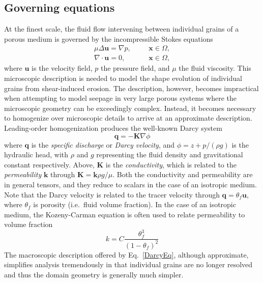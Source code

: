 \documentclass[11pt]{article}
\newcommand{\bvec}[1]{{\mathbf{#1}}}
\newcommand{\grad}{\nabla}
\newcommand{\uu}{\bvec{u}}
\newcommand{\xx}{\bvec{x}}
\newcommand {\qq} {\bvec{q}}
\begin{document}
\subsection{Governing equations}
At the finest scale, the fluid flow intervening between individual grains of a porous medium is governed by the incompressible Stokes equations
\begin{equation}
\label{StokesEq}
\begin{split}
\mu \Delta \uu = \grad p,	&\hspace{20pt} \xx \in \Omega, \\
\grad \cdot \uu = 0, 		&\hspace{20pt} \xx \in \Omega,
\end{split}
\end{equation}
where $\uu$ is the velocity field, $p$ the pressure field, and $\mu$ the fluid viscosity. This microscopic description is needed to model the shape evolution of individual grains from shear-induced erosion. The description, however, becomes impractical when attempting to model seepage in very large porous systems where the microscopic geometry can be exceedingly complex. Instead, it becomes necessary to homogenize over microscopic details to arrive at an approximate description. Leading-order homogenization produces the well-known Darcy system
\begin{equation}
\label{DarcyEq}
\qq = - \bvec{K} \grad \phi
\end{equation}
where $\qq$ is the {\em specific discharge} or {\em Darcy velocity}, and $\phi = z + p/(\rho g)$ is the hydraulic head, with $\rho$ and $g$ representing the fluid density and gravitational constant respectively. Above, $\bvec{K}$ is the {\em conductivity}, which is related to the {\em permeability} $\bvec{k}$ through $\bvec{K} = \bvec{k} \rho g/\mu$. Both the conductivity and permeability are in general tensors, and they reduce to scalars in the case of an isotropic medium.
Note that the Darcy velocity is related to the tracer velocity through $\qq = \theta_f \uu$, where $\theta_f$ is porosity (i.e.~fluid volume fraction).
In the case of an isotropic medium, the Kozeny-Carman equation is often used to relate permeability to volume fraction \cite{bear2013dynamics}
\begin{equation}
k = C \frac{\theta_f^3}{(1-\theta_f)^2}
\end{equation}
The macroscopic description offered by Eq.~\eqref{DarcyEq}, although approximate, simplifies analysis tremendously in that individual grains are no longer resolved and thus the domain geometry is generally much simpler.
\end{document}
